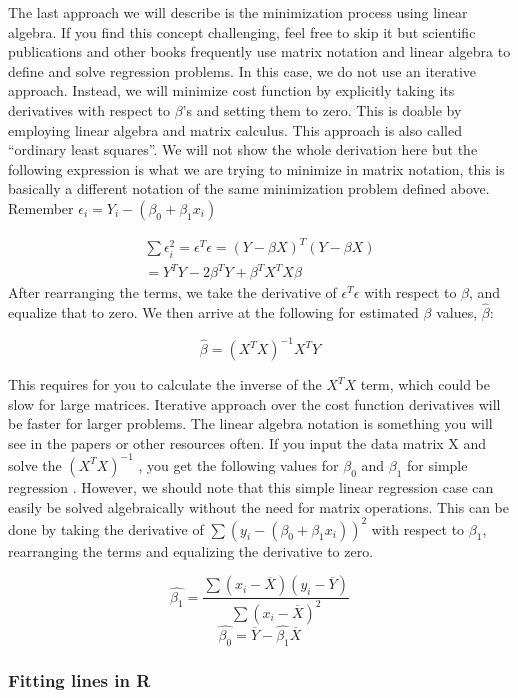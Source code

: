 \documentclass[12pt,]{krantz}
\theoremstyle{definition}
\theoremstyle{definition}
\theoremstyle{definition}
\theoremstyle{remark}
\begin{document}
The last approach we will describe is the minimization process using
linear algebra. If you find this concept challenging, feel free to skip
it but scientific publications and other books frequently use matrix
notation and linear algebra to define and solve regression problems. In
this case, we do not use an iterative approach. Instead, we will
minimize cost function by explicitly taking its derivatives with respect
to \(\beta\)'s and setting them to zero. This is doable by employing
linear algebra and matrix calculus. This approach is also called
``ordinary least squares''. We will not show the whole derivation here
but the following expression is what we are trying to minimize in matrix
notation, this is basically a different notation of the same
minimization problem defined above. Remember
\(\epsilon_i=Y_i-(\beta_0+\beta_1x_i)\)

\[
\begin{aligned}
\sum\epsilon_{i}^2=\epsilon^T\epsilon=(Y-{\beta}{X})^T(Y-{\beta}{X}) \\
=Y^T{Y}-2{\beta}^T{Y}+{\beta}^TX^TX{\beta}
\end{aligned}
\] After rearranging the terms, we take the derivative of
\(\epsilon^T\epsilon\) with respect to \(\beta\), and equalize that to
zero. We then arrive at the following for estimated \(\beta\) values,
\(\hat{\beta}\):

\[\hat{\beta}=(X^TX)^{-1}X^TY\]

This requires for you to calculate the inverse of the \(X^TX\) term,
which could be slow for large matrices. Iterative approach over the cost
function derivatives will be faster for larger problems. The linear
algebra notation is something you will see in the papers or other
resources often. If you input the data matrix X and solve the
\((X^TX)^{-1}\) , you get the following values for \(\beta_0\) and
\(\beta_1\) for simple regression . However, we should note that this
simple linear regression case can easily be solved algebraically without
the need for matrix operations. This can be done by taking the
derivative of \(\sum{(y_i-(\beta_0+\beta_1x_i))^2}\) with respect to
\(\beta_1\), rearranging the terms and equalizing the derivative to
zero.

\[\hat{\beta_1}=\frac{\sum{(x_i-\overline{X})(y_i-\overline{Y})}}{ \sum{(x_i-\overline{X})^2} }\]
\[\hat{\beta_0}=\overline{Y}-\hat{\beta_1}\overline{X}\]

\hypertarget{fitting-lines-in-r}{%
\subsubsection{Fitting lines in R}\label{fitting-lines-in-r}}
\end{document}

